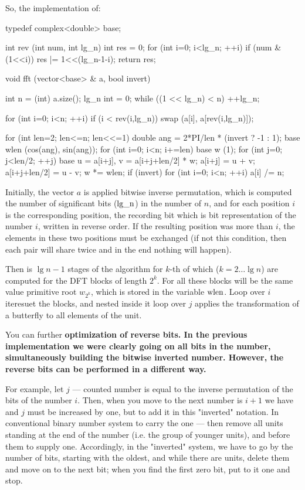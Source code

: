 So, the implementation of:

\code
typedef complex<double> base;

int rev (int num, int lg_n) {
int res = 0;
for (int i=0; i<lg_n; ++i)
if (num & (1<<i))
res |= 1<<(lg_n-1-i);
return res;
}

void fft (vector<base> & a, bool invert) {
int n = (int) a.size();
lg_n int = 0;
while ((1 << lg_n) < n) ++lg_n;

for (int i=0; i<n; ++i)
if (i < rev(i,lg_n))
swap (a[i], a[rev(i,lg_n)]);

for (int len=2; len<=n; len<<=1) {
double ang = 2*PI/len * (invert ? -1 : 1);
base wlen (cos(ang), sin(ang));
for (int i=0; i<n; i+=len) {
base w (1);
for (int j=0; j<len/2; ++j) {
base u = a[i+j], v = a[i+j+len/2] * w;
a[i+j] = u + v;
a[i+j+len/2] = u - v;
w *= wlen;
}
}
}
if (invert)
for (int i=0; i<n; ++i)
a[i] /= n;
}

\endcode

Initially, the vector $a$ is applied bitwise inverse permutation, which is computed the number of significant bits ($\rm lg\_n$) in the number of $n$, and for each position $i$ is the corresponding position, the recording bit which is bit representation of the number $i$, written in reverse order. If the resulting position was more than $i$, the elements in these two positions must be exchanged (if not this condition, then each pair will share twice and in the end nothing will happen).

Then is $\lg n - 1$ stages of the algorithm for $k$-th of which ($k=2 \ldots \lg n$) are computed for the DFT blocks of length $2^k$. For all these blocks will be the same value primitive root $w_{2^k}$, which is stored in the variable $\rm wlen$. Loop over $i$ iteresuet the blocks, and nested inside it loop over $j$ applies the transformation of a butterfly to all elements of the unit.

You can further \bf{optimization of reverse bits}. In the previous implementation we were clearly going on all bits in the number, simultaneously building the bitwise inverted number. However, the reverse bits can be performed in a different way.

For example, let $j$ --- counted number is equal to the inverse permutation of the bits of the number $i$. Then, when you move to the next number is $i+1$ we have and $j$ must be increased by one, but to add it in this "inverted" notation. In conventional binary number system to carry the one --- then remove all units standing at the end of the number (i.e. the group of younger units), and before them to supply one. Accordingly, in the "inverted" system, we have to go by the number of bits, starting with the oldest, and while there are units, delete them and move on to the next bit; when you find the first zero bit, put to it one and stop.


